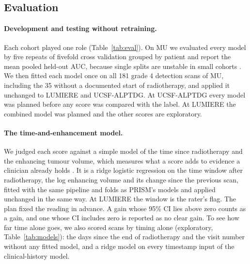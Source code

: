 \subsection{Evaluation}\label{sec:2.3}

\paragraph*{Development and testing without retraining.} Each cohort played one role (Table~\ref{tab:eval}). On MU we
evaluated every model by five repeats of fivefold cross validation grouped by patient and report the mean pooled
held-out AUC, because single splits are unstable in small cohorts \citep{varoquaux2018}. We then fitted each model
once on all 181 grade 4 detection scans of MU, including the 35 without a documented start of radiotherapy, and
applied it unchanged to LUMIERE and UCSF-ALPTDG. At UCSF-ALPTDG every model was planned before any score was compared
with the label. At LUMIERE the combined model was planned and the other scores are exploratory.

\paragraph*{The time-and-enhancement model.} We judged each score against a simple model of the time since
radiotherapy and the enhancing tumour volume, which measures what a score adds to evidence a clinician already holds
\citep{beaulieujones2021}. It is a ridge logistic regression on the time window after radiotherapy, the log enhancing
volume and its change since the previous scan, fitted with the same pipeline and folds as PRISM's models and applied
unchanged in the same way. At LUMIERE the window is the rater's flag. The plan fixed the reading in advance. A gain
whose 95\% CI lies above zero counts as a gain, and one whose CI includes zero is reported as no clear gain. To see how
far time alone goes, we also scored scans by timing alone (exploratory, Table~\ref{tab:models}): the days since the
end of radiotherapy and the visit number without any fitted model, and a ridge model on every timestamp input of the
clinical-history model.

